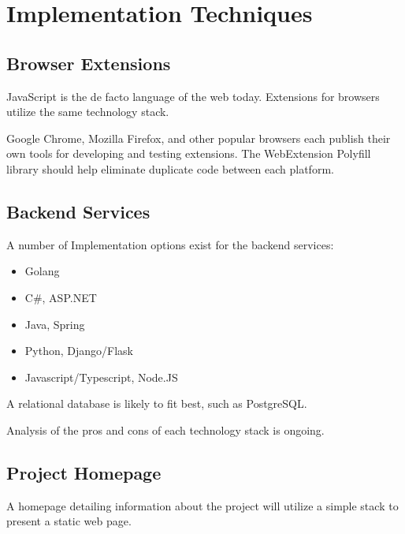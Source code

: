 \documentclass[proposal.tex]{subfiles}
\begin{document}
    
\section{Implementation Techniques}

\subsection{Browser Extensions}

JavaScript is the de facto language of the web today.
Extensions for browsers utilize the same technology stack.

Google Chrome, Mozilla Firefox, and other popular browsers each publish their own tools for developing and testing extensions.
The WebExtension Polyfill library should help eliminate duplicate code between each platform.


\subsection{Backend Services}

A number of Implementation options exist for the backend services:

\begin{itemize}
    \item Golang 
    \item C\#, ASP.NET
    \item Java, Spring
    \item Python, Django/Flask
    \item Javascript/Typescript, Node.JS
\end{itemize}

A relational database is likely to fit best, such as PostgreSQL.

Analysis of the pros and cons of each technology stack is ongoing.


\subsection{Project Homepage}

A homepage detailing information about the project will utilize a simple stack to present a static web page.
\end{document}
